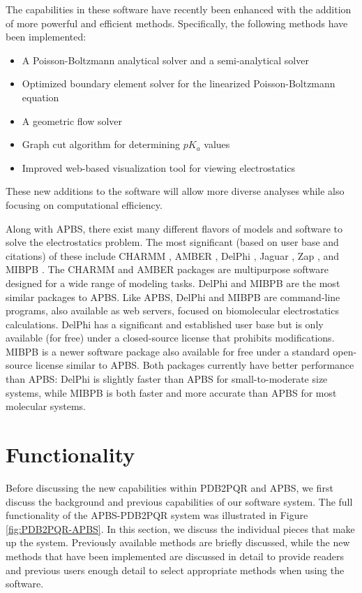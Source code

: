 \documentclass[journal=jpcbfk, manuscript=article]{achemso}
\begin{document}
The capabilities in these software have recently been enhanced with the addition of more powerful and efficient methods. Specifically, the following methods have been implemented:

\begin{itemize}
	\itemsep-0.25em
	\item A Poisson-Boltzmann analytical solver and a semi-analytical solver
	\item Optimized boundary element solver for the linearized Poisson-Boltzmann equation
	\item A geometric flow solver
	\item Graph cut algorithm for determining $pK_a$ values
	\item Improved web-based visualization tool for viewing electrostatics
\end{itemize}
These new additions to the software will allow more diverse analyses while also focusing on computational efficiency.

Along with APBS, there exist many different flavors of models and software to solve the electrostatics problem. The most significant (based on user base and citations) of these include CHARMM \cite{brooks2009}, AMBER \cite{case2005}, DelPhi \cite{sarkar2013}, Jaguar \cite{bochevarov2013}, Zap \cite{grant2001}, and MIBPB \cite{chen2011}. The CHARMM and AMBER packages are multipurpose software designed for a wide range of modeling tasks. DelPhi and MIBPB are the most similar packages to APBS. Like APBS, DelPhi and MIBPB are command-line programs, also available as web servers, focused on biomolecular electrostatics calculations. DelPhi has a significant and established user base but is only available (for free) under a closed-source license that prohibits modifications. MIBPB is a newer software package also available for free under a standard open-source license similar to APBS. Both packages currently have better performance than APBS: DelPhi is slightly faster than APBS for small-to-moderate size systems, while MIBPB is both faster and more accurate than APBS for most molecular systems. 

\section{Functionality}
Before discussing the new capabilities within PDB2PQR and APBS, we first discuss the background and previous capabilities of our software system. The full functionality of the APBS-PDB2PQR system was illustrated in Figure \ref{fig:PDB2PQR-APBS}. In this section, we discuss the individual pieces that make up the system. Previously available methods are briefly discussed, while the new methods that have been implemented are discussed in detail to provide readers and previous users enough detail to select appropriate methods when using the software.
\end{document}
